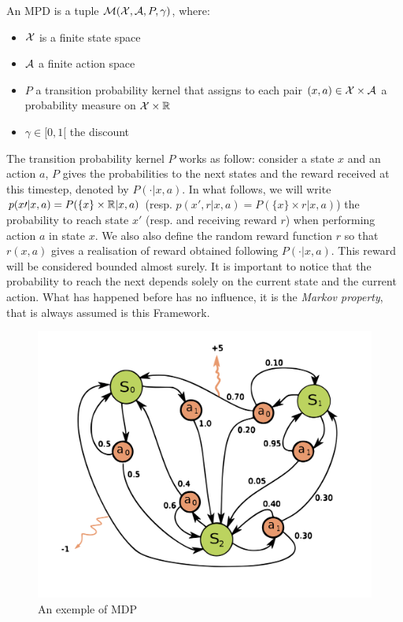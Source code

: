 \begin{definition}
An MPD is a tuple $\mathcal{M}(\mathcal{X}, \mathcal{A}, P, \gamma)$, where:
\begin{itemize}
    \item $\mathcal{X}$ is a finite state space
    \item $\mathcal{A}$ a finite action space
    \item $P$ a transition probability kernel that assigns to each pair $(x,a) \in \mathcal{X} \times \mathcal{A}$ a probability measure on $\mathcal{X} \times \mathbb{R}$
    \item $\gamma \in [0,1[$ the discount
\end{itemize}

\end{definition}

The transition probability kernel $P$ works as follow: consider a state $x$ and an action $a$, $P$ gives the probabilities to the next states and the reward received at this timestep, denoted by $P(\cdot |x,a)$. In what follows, we will write $p(x\prime|x, a) = P(\{x\} \times \mathbb{R}|x,a)$ (resp. $p(x\prime, r|x,a) = P(\{x\} \times r|x,a)$) the probability to reach state $x\prime$ (resp. and receiving reward $r$) when performing action $a$ in state $x$. We also also define the random reward function $r$ so that $r(x,a)$ gives a realisation of reward obtained following $P(\cdot |x,a)$. This reward will be considered bounded almost surely. It is important to notice that the probability to reach the next depends solely on the current state and the current action. What has happened before has no influence, it is the \emph{Markov property}, that is always assumed is this Framework.

\begin{figure}[!ht]
    \centering
    \includegraphics[height=0.3\textheight]{figures/personal_work/Markov_Decision_Process.svg.png}
    \caption{An exemple of MDP\cite{enwiki:1106395391}}
\end{figure}

